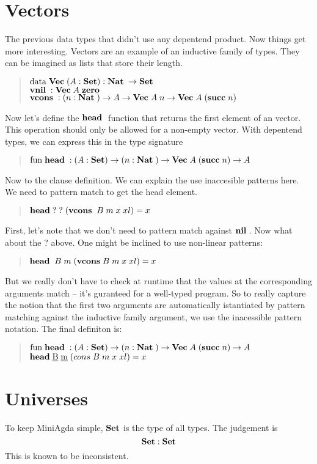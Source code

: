\section{Vectors}
The previous data types that didn't use any depentend product. 
Now things get more interesting.
Vectors are an example of an inductive family of types.
They can be imagined as lists that store their length.
\begin{quote}
$\mathrm{data}\; \mathbf{Vec}\; ( A : \mathbf{Set} ) : \mathbf{Nat}\; \rightarrow \mathbf{Set} $ 
\\
$\mathbf{vnil}\; : \mathbf{Vec}\; A \; \mathbf{zero}\;  $
\\
$\mathbf{vcons}\; : ( n : \mathbf{Nat}\; ) \rightarrow  A \rightarrow \mathbf{Vec}\; A \; n \rightarrow \mathbf{Vec}\; A \; (\mathbf{succ}\; n) $
\end{quote}
Now let's define the $\mathbf{head}\;$ function that returns the first element of an vector. This operation should only be allowed for a non-empty vector.
With depentend types, we can express this in the type signature
\begin{quote}
$ \mathrm{fun}\; \mathbf{head}\; : ( A : \mathbf{Set} ) \rightarrow ( n : \mathbf{Nat}\; ) \rightarrow \mathbf{Vec}\; A \; (\mathbf{succ}\; n) \rightarrow A $
\end{quote}
Now to the clause definition. We can explain the use inaccesible patterns here.
We need to pattern match to get the head element.
\begin{quote}
$\mathbf{head}\; ? \; ? \; (\mathbf{vcons}\; \; B \; m \; x \; xl) = x $
\end{quote}
First, let's note that we don't need to pattern match against $\mathbf{nil}\;$.
Now what about the ? above. 
One might be inclined to use non-linear patterns:
\begin{quote}
$\mathbf{head}\; \; B \; m \; (\mathbf{vcons}\;  B \; m \; x \; xl) = x $
\end{quote}
But we really don't have to check at runtime that the values at the corresponding arguments match -- it's guranteed for a well-typed program.
So to really capture the notion that the first two arguments are automatically istantiated by pattern matching against the inductive family argument, we use the inacessible pattern notation. The final definiton is:
\begin{quote}
$ \mathrm{fun}\; \mathbf{head}\; : ( A : \mathbf{Set} ) \rightarrow ( n : \mathbf{Nat}\; ) \rightarrow \mathbf{Vec}\; A \; (\mathbf{succ}\; n) \rightarrow A $
\\
$\mathbf{head}\; \underbar{B} \; \underbar{m} \; (cons \; B \; m \; x \; xl) = x $
\end{quote}
\section{Universes}
To keep MiniAgda simple, $\mathbf{Set}$ is the type of all types.
The judgement is
\[\mathbf{Set} : \mathbf{Set} \]
This is known to be inconsistent.
